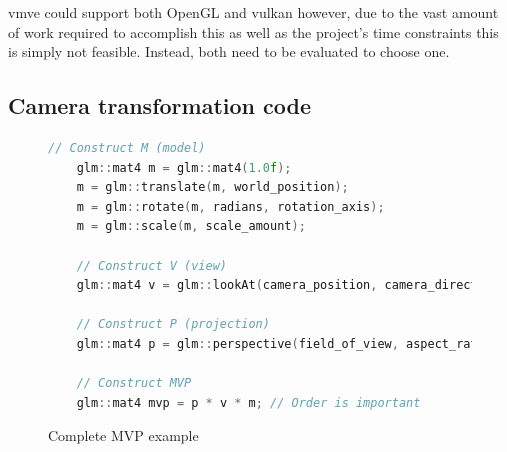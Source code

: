 \documentclass[11pt]{article}
\begin{document}
\gls{vmve} could support both OpenGL and \gls{vulkan} however, due to the vast
amount of work required to accomplish this as well as the project's time
constraints this is simply not feasible. Instead, both need to be evaluated to
choose one.


\subsection{Camera transformation code}
\begin{figure}[ht]
  \centering
  \begin{lstlisting}[language=C++]
    // Construct M (model)
    glm::mat4 m = glm::mat4(1.0f);
    m = glm::translate(m, world_position);   
    m = glm::rotate(m, radians, rotation_axis); 
    m = glm::scale(m, scale_amount);

    // Construct V (view)
    glm::mat4 v = glm::lookAt(camera_position, camera_direction, camera_up);

    // Construct P (projection)
    glm::mat4 p = glm::perspective(field_of_view, aspect_ratio, near, far);

    // Construct MVP
    glm::mat4 mvp = p * v * m; // Order is important

  \end{lstlisting}
  \caption{Complete MVP example}
  \label{fig:local_to_world_appendix}
\end{figure}
\end{document}
